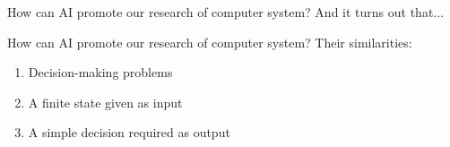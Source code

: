 \documentclass[UTF8]{ctexbeamer}
\begin{document}
\begin{frame}{How can AI promote our research of computer system?}
  And it turns out that...
  \begin{center} 
  \end{center} 
\end{frame}

\begin{frame}{How can AI promote our research of computer system?}
  Their similarities:
  \begin{enumerate}
    \item<2-> Decision-making problems
    \item<3-> A finite state given as input
    \item<4-> A simple decision required as output
  \end{enumerate}

\end{frame}
\end{document}
